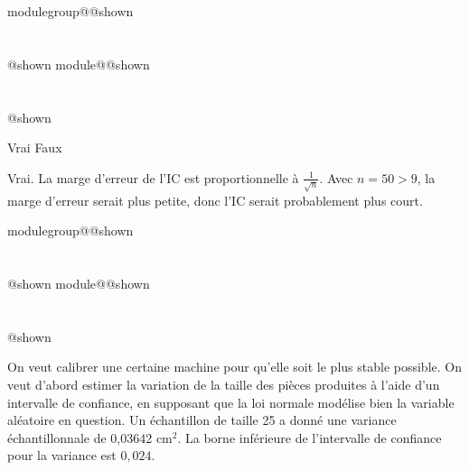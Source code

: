 \documentclass{Evaluation}
\makeatletter
\newcommand{\currentmodulekey}{}
\newcommand{\currentmoduletitle}{}
\newcommand{\currentgroupkey}{}
\newcommand{\currentgrouptitle}{}
\newcommand{\showmoduleifneeded}{%
  \ifx\currentgroupkey\empty\else
    \expandafter\ifx\csname modulegroup@\currentgroupkey @shown\endcsname\relax
      \section*{\currentgrouptitle}%
      \expandafter\gdef\csname modulegroup@\currentgroupkey @shown\endcsname{1}%
    \fi
  \fi
  \expandafter\ifx\csname module@\currentmodulekey @shown\endcsname\relax
    \section*{\currentmoduletitle}%
    \expandafter\gdef\csname module@\currentmodulekey @shown\endcsname{1}%
  \fi
}
\newenvironment{A24}{\showmoduleifneeded}{}
\makeatother
\begin{document}
\begin{questions}
\begin{A24}
\begin{parts}
    \begin{oneparcheckboxes}
        \correctchoice Vrai
        \choice Faux
    \end{oneparcheckboxes}
    \begin{solution}
    Vrai. La marge d'erreur de l'IC est proportionnelle à $\frac{1}{\sqrt{n}}$. Avec $n = 50 > 9$, la marge d'erreur serait plus petite, donc l'IC serait probablement plus court.
    \end{solution}

\end{parts}
\end{A24}

\begin{A24}
\question {} %
On veut calibrer une certaine machine pour qu'elle soit le plus stable possible.
On veut d’abord estimer la variation de la taille des pièces produites à l'aide d'un intervalle de confiance, en supposant que la loi normale modélise bien la variable aléatoire en question.
Un échantillon de taille 25 a donné une variance échantillonnale de 0,03642 cm$^2$.
La borne inférieure de l'intervalle de confiance pour la variance est $0,024$.

\end{A24}
\end{questions}
\end{document}
